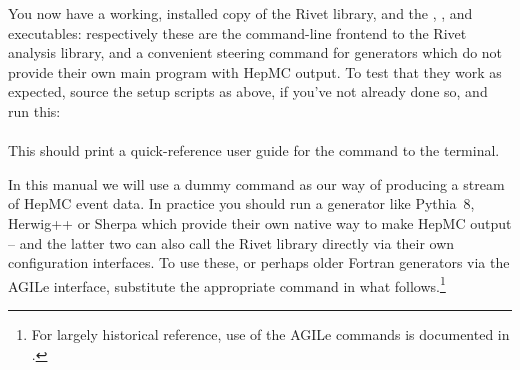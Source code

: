 You now have a working, installed copy of the Rivet library, and the
, , and  executables: respectively these are the
command-line frontend to the Rivet analysis library, and a convenient steering
command for generators which do not provide their own main program with HepMC
output. To test that they work as expected, source the setup scripts as above,
if you've not already done so, and run this:\\
\\
%
This should print a quick-reference user guide for the  command to
the terminal.
%

In this manual we will use a dummy  command as our way of
producing a stream of HepMC event data. In practice you should run a generator
like Pythia~8\cite{Sjostrand:2007gs,Sjostrand:2008vc},
Herwig++\cite{Bahr:2008pv} or Sherpa\cite{Gleisberg:2008ta} which provide their
own native way to make HepMC output -- and the latter two can also call the
Rivet library directly via their own configuration interfaces. To use these, or
perhaps older Fortran generators via the AGILe interface, substitute the
appropriate command in what follows.\footnote{For largely historical reference,
  use of the AGILe commands is documented in
.}





